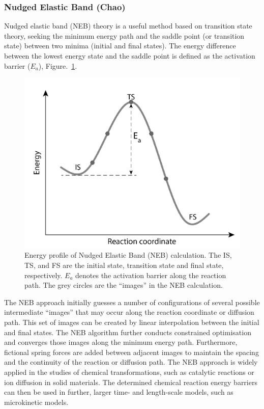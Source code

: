 \documentclass[../main.tex]{subfiles}
\begin{document}
\subsubsection{Nudged Elastic Band (Chao)} 
\label{sec:methods_neb}
Nudged elastic band (NEB) theory is a useful method based on transition state theory, seeking the minimum energy path and the saddle point (or transition state) between two minima (initial and final states).\cite{henkelman2000climbing,henkelman2000improved} The energy difference between the lowest energy state and the saddle point is defined as the activation barrier ($E_a$), Figure.~\ref{fig:NEB_profile}. \cite{henkelman2000improved}

\begin{figure}
    \centering
    \includegraphics[scale=0.6]{figures/NEB_profile.png}
    \caption{Energy profile of Nudged Elastic Band (NEB) calculation. The IS, TS, and FS are the initial state, transition state and final state, respectively. $E_a$ denotes the activation barrier along the reaction path. The grey circles are the ``images'' in the NEB calculation.}
    \label{fig:NEB_profile}
\end{figure}

The NEB approach initially guesses a number of configurations of several possible intermediate ``images'' that may occur along the reaction coordinate or diffusion path. This set of images can be created by linear interpolation between the initial and final states. The NEB algorithm further conducts constrained optimisation and converges those images along the minimum energy path. Furthermore, fictional spring forces are added between adjacent images to maintain the spacing and the continuity of the reaction or diffusion path. The NEB approach is widely applied in the studies of chemical transformations, such as catalytic reactions or ion diffusion in solid materials. The determined chemical reaction energy barriers can then be used in further, larger time- and length-scale models, such as microkinetic models.\cite{peng2020lithium,Mercer2021}
\end{document}
